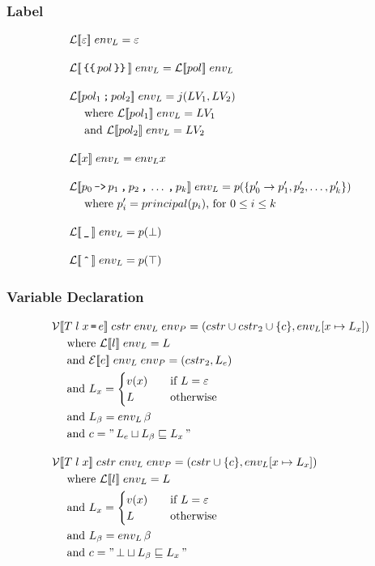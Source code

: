 \subsubsection{Label}
\begin{align*}
& \iL\dblSq{\varepsilon} \; \ienvL = \varepsilon \rspace
%
& \iL\dblSq{\tk{\{\{} pol \tk{\}\}}} \; \ienvL = \iL\dblSq{pol} \; \ienvL \rspace
%
& \iL\dblSq{pol_1 \tk ; pol_2} \; \ienvL = j(\iLV_1, \iLV_2) \\
& \dsWhere{\iL\dblSq{pol_1} \; \ienvL = \iLV_1} \\
& \dsAnd{\iL\dblSq{pol_2} \; \ienvL = \iLV_2} \rspace
%
& \iL\dblSq{x} \; \ienvL = \ienvL x \rspace
%
& \iL\dblSq{p_0 \tk{->} p_1 \tk , p_2 \tk, \dots \tk , p_k} \; \ienvL = p(\{p_0' \rightarrow p_1', p_2', \dots, p_k'\}) \\
& \dsWhere{p_i' = principal(p_i) \text{, for } 0 \leq i \leq k} \rspace
%
& \iL\dblSq{\tk \_} \; \ienvL = p(\bot) \rspace
& \iL\dblSq{\tk{\^{}}} \; \ienvL = p(\top)
\end{align*}

\subsubsection{Variable Declaration}
\begin{align*}
& \iV\dblSq{T \; l \; x \tk = e} \; \icstr \; \ienvL \; \ienvP = (\icstr \cup \icstr_2 \cup \{ c \}, \ienvL[x \mapsto L_x]) \\
& \dsWhere{\iL\dblSq{l} \; \ienvL = L} \\
& \dsAnd{\iE\dblSq{e} \; \ienvL \; \ienvP = (\icstr_2, L_e)} \\
& \dsAnd{L_x = \begin{cases}
    v(x) & \quad \text{if } L = \varepsilon \\
    L & \quad \text{otherwise}
  \end{cases}} \\
& \dsAnd{L_\ib = \ienvL \, \ib} \\
& \dsAnd{c = " \, L_e \sqcup L_\ib \sqsubseteq L_x \, "} \rspace
& \iV\dblSq{T \; l \; x} \; \icstr \; \ienvL \; \ienvP = (cstr \cup \{ c \}, \ienvL[x \mapsto L_x])\\
& \dsWhere{\iL\dblSq{l} \; \ienvL = L} \\
& \dsAnd{L_x = \begin{cases}
    v(x) & \quad \text{if } L = \varepsilon \\
    L & \quad \text{otherwise}
  \end{cases}} \\
& \dsAnd{L_\ib = \ienvL \, \ib} \\
& \dsAnd{c = " \, \bot \sqcup L_\ib \sqsubseteq L_x \, "}
\end{align*}


